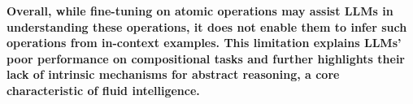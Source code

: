 
\textbf{Overall, while fine-tuning on atomic operations may assist LLMs in understanding these operations, it does not enable them to infer such operations from in-context examples. This limitation explains LLMs' poor performance on compositional tasks and further highlights their lack of intrinsic mechanisms for abstract reasoning, a core characteristic of fluid intelligence.
}






